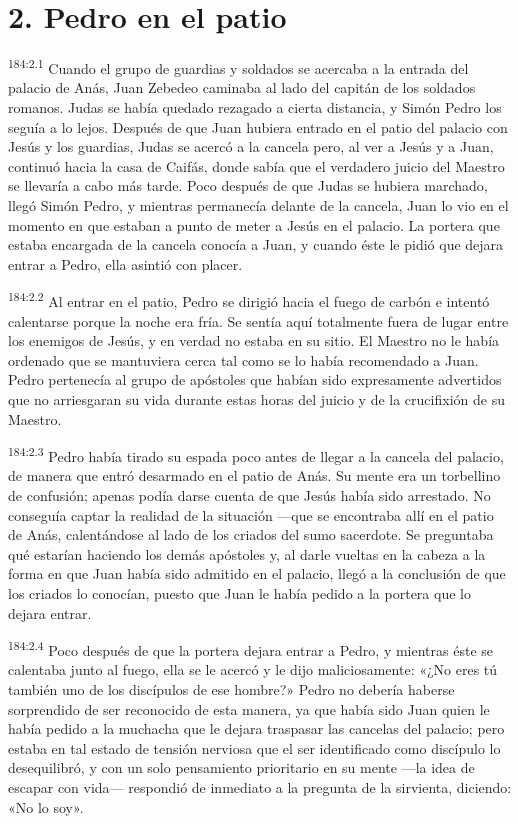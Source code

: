 \section*{2. Pedro en el patio}
\par 
\textsuperscript{184:2.1} Cuando el grupo de guardias y soldados se acercaba a la entrada del palacio de Anás, Juan Zebedeo caminaba al lado del capitán de los soldados romanos. Judas se había quedado rezagado a cierta distancia, y Simón Pedro los seguía a lo lejos. Después de que Juan hubiera entrado en el patio del palacio con Jesús y los guardias, Judas se acercó a la cancela pero, al ver a Jesús y a Juan, continuó hacia la casa de Caifás, donde sabía que el verdadero juicio del Maestro se llevaría a cabo más tarde. Poco después de que Judas se hubiera marchado, llegó Simón Pedro, y mientras permanecía delante de la cancela, Juan lo vio en el momento en que estaban a punto de meter a Jesús en el palacio. La portera que estaba encargada de la cancela conocía a Juan, y cuando éste le pidió que dejara entrar a Pedro, ella asintió con placer.

\par 
\textsuperscript{184:2.2} Al entrar en el patio, Pedro se dirigió hacia el fuego de carbón e intentó calentarse porque la noche era fría. Se sentía aquí totalmente fuera de lugar entre los enemigos de Jesús, y en verdad no estaba en su sitio. El Maestro no le había ordenado que se mantuviera cerca tal como se lo había recomendado a Juan. Pedro pertenecía al grupo de apóstoles que habían sido expresamente advertidos que no arriesgaran su vida durante estas horas del juicio y de la crucifixión de su Maestro.

\par 
\textsuperscript{184:2.3} Pedro había tirado su espada poco antes de llegar a la cancela del palacio, de manera que entró desarmado en el patio de Anás. Su mente era un torbellino de confusión; apenas podía darse cuenta de que Jesús había sido arrestado. No conseguía captar la realidad de la situación ---que se encontraba allí en el patio de Anás, calentándose al lado de los criados del sumo sacerdote. Se preguntaba qué estarían haciendo los demás apóstoles y, al darle vueltas en la cabeza a la forma en que Juan había sido admitido en el palacio, llegó a la conclusión de que los criados lo conocían, puesto que Juan le había pedido a la portera que lo dejara entrar.

\par 
\textsuperscript{184:2.4} Poco después de que la portera dejara entrar a Pedro, y mientras éste se calentaba junto al fuego, ella se le acercó y le dijo maliciosamente: «¿No eres tú también uno de los discípulos de ese hombre?» Pedro no debería haberse sorprendido de ser reconocido de esta manera, ya que había sido Juan quien le había pedido a la muchacha que le dejara traspasar las cancelas del palacio; pero estaba en tal estado de tensión nerviosa que el ser identificado como discípulo lo desequilibró, y con un solo pensamiento prioritario en su mente ---la idea de escapar con vida--- respondió de inmediato a la pregunta de la sirvienta, diciendo: «No lo soy».

